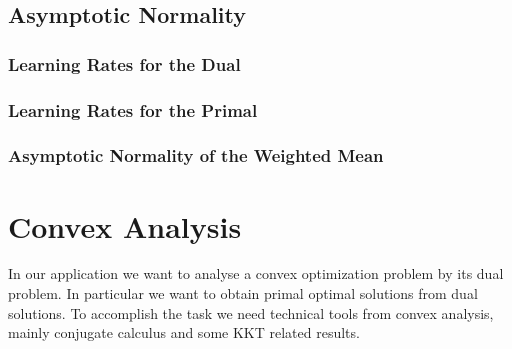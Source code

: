 \documentclass[11pt, a4paper, BCOR=10mm, DIV=11]{scrbook}
\theoremstyle{definition}
\theoremstyle{plain}
\begin{document}
  \section{Asymptotic Normality}
  \subsection*{Learning Rates for the Dual}
  \subsection*{Learning Rates for the Primal}
  \subsection*{Asymptotic Normality of the Weighted Mean}
%  
%  
%  
%
%  

\chapter{Convex Analysis}
In our application we want to analyse a convex optimization problem by its dual problem.
In particular we want to obtain primal optimal solutions from dual solutions.
To accomplish the task we need technical tools from convex analysis, 
mainly conjugate calculus and some KKT related results.
\end{document}
